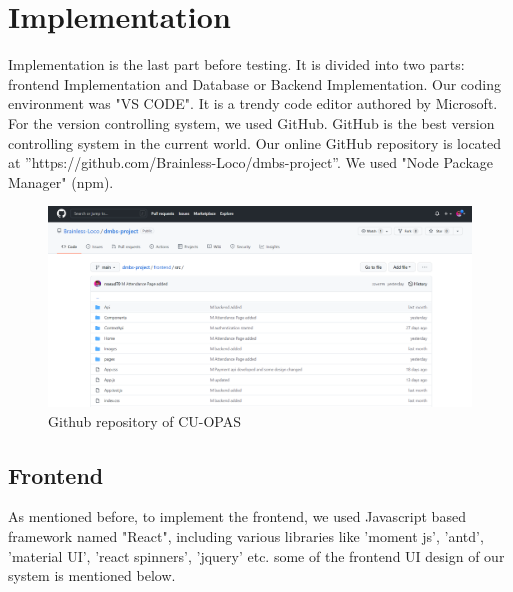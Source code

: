 \section{Implementation}\label{sec:imp}
Implementation is the last part before testing. It is divided into two parts: frontend Implementation and Database or Backend Implementation. Our coding environment was "VS CODE". It is a trendy code editor authored by Microsoft. For the version controlling system, we used GitHub. GitHub is the best version controlling system in the current world. Our online GitHub repository is located at ''https://github.com/Brainless-Loco/dmbs-project''. We used "Node Package Manager" (npm).
\begin{figure}[H]
	\includegraphics[width=1\textwidth]{images/github}
	\caption{Github repository of CU-OPAS}
\end{figure}

\subsection{Frontend}\label{sub:frontend}
As mentioned before, to implement the frontend, we used Javascript based framework named "React", including various libraries like 'moment js', 'antd', 'material UI', 'react spinners', 'jquery' etc. some of the frontend UI design of our system is mentioned below.

